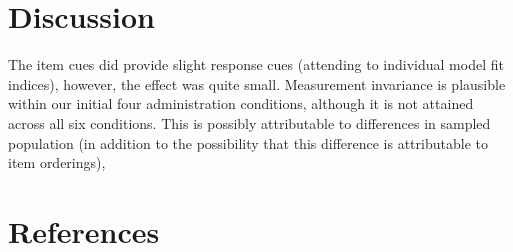 \documentclass[
  man]{apa7}
\begin{document}
\hypertarget{discussion}{%
\section{Discussion}\label{discussion}}

The item cues did provide slight response cues (attending to individual model fit indices), however, the effect was quite small. Measurement invariance is plausible within our initial four administration conditions, although it is not attained across all six conditions. This is possibly attributable to differences in sampled population (in addition to the possibility that this difference is attributable to item orderings),

\newpage

\hypertarget{references}{%
\section{References}\label{references}}

\begingroup
\setlength{\parindent}{-0.5in}
\setlength{\leftskip}{0.5in}
\end{document}
